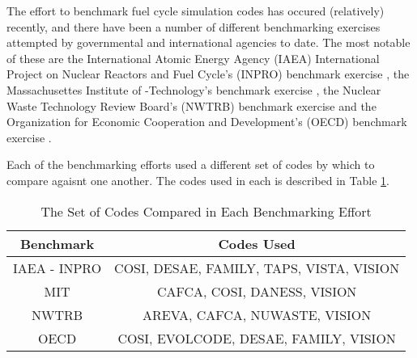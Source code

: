 The effort to benchmark fuel cycle simulation codes has occured (relatively)
recently, and there have been a number of different benchmarking exercises
attempted by governmental and international agencies to date. The most notable
of these are the International Atomic Energy Agency (IAEA) International Project
on Nuclear Reactors and Fuel Cycle's (INPRO) benchmark
exercise \cite{_international_2009}, the Massachusettes Institute of
-Technology's benchmark exercise \cite{guerin_benchmark_2009}, the Nuclear Waste
Technology Review Board's (NWTRB) benchmark
exercise \cite{abkowitz_workshop_2011,_nuclear_2011} and the Organization for
Economic Cooperation and Development's (OECD) benchmark
exercise \cite{boucher_benchmark_2012}.

Each of the benchmarking efforts used a different set of codes by which to
compare agaisnt one another. The codes used in each is described in
Table \ref{tab:benchmark-codes}.

\begin{table} [h!]
\centering
\begin{tabular} {|c|c|} 
\hline
Benchmark & Codes Used \\
\hline
IAEA - INPRO & COSI, DESAE, FAMILY, TAPS, VISTA, VISION \\
MIT          & CAFCA, COSI, DANESS, VISION \\
NWTRB        & AREVA, CAFCA, NUWASTE, VISION \\
OECD         & COSI, EVOLCODE, DESAE, FAMILY, VISION \\
\hline
\end{tabular}
\caption{The Set of Codes Compared in Each Benchmarking Effort}
\label{tab:benchmark-codes}
\end{table}


